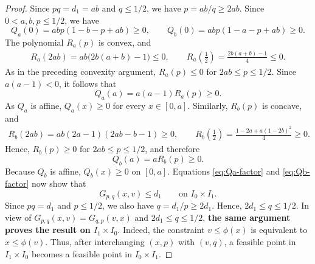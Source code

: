 \documentclass[10pt,a4paper]{amsart}
\begin{document}
\begin{proof}
Since $pq=d_1=ab$ and $q\leq1/2$, we have
$p=ab/q\geq2ab$.
Since $0<a,b,p\leq1/2$, we have
\begin{equation*}
 Q_a(0)=abp(1-b-p+ab)\geq0,\qquad
 Q_b(0)=abp(1-a-p+ab)\geq0.
\end{equation*}
The polynomial $R_a(p)$ is convex, and
\begin{align*}
 R_a(2ab)
 =
 ab\bigl(2b(a+b)-1\bigr)\leq0,\qquad
 R_a\left(\frac12\right)
 =
 \frac{2b(a+b)-1}{4}\leq0.
\end{align*}
As in the preceding
convexity argument, $R_a(p)\leq0$ for $2ab\leq p\leq1/2$. Since
$a(a-1)<0$, it follows that
\begin{equation*}
 Q_a(a)=a(a-1)R_a(p)\geq0.
\end{equation*}
As $Q_a$ is affine, $Q_a(x)\geq0$ for every $x\in[0,a]$.
Similarly, $R_b(p)$ is concave, and
\begin{align*}
 R_b(2ab)
 =
 ab(2a-1)(2ab-b-1)\geq0,\qquad
 R_b\left(\frac12\right)
 =
 \frac{1-2a+a(1-2b)^2}{4}\geq0.
\end{align*}
Hence, $R_b(p)\geq0$ for $2ab\leq p\leq1/2$, and therefore
\begin{equation*}
 Q_b(a)=aR_b(p)\geq0.
\end{equation*}
Because $Q_b$ is affine, $Q_b(x)\geq0$ on $[0,a]$.
Equations \eqref{eq:Qa-factor} and \eqref{eq:Qb-factor} now show that
\begin{equation*}
 G_{p,q}(x,v)\leq d_1
 \qquad\text{on }I_0\times I_1.
\end{equation*}
Since $pq=d_1$ and $p\leq1/2$, we also have
$q=d_1/p\geq2d_1$. Hence, $2d_1\leq q\leq1/2$.
In  view of  $G_{p,q}(x,v)=G_{q,p}(v,x)$
and $2d_1\leq q\leq1/2$, \textbf{the same argument proves the result on
$I_1\times I_0$}. Indeed, the constraint $v\leq\phi(x)$ is equivalent to
$x\leq\phi(v)$. Thus,
after interchanging $(x,p)$ with $(v,q)$, a feasible point in
$I_1\times I_0$ becomes a feasible point in $I_0\times I_1$. 



\end{proof}
\end{document}
